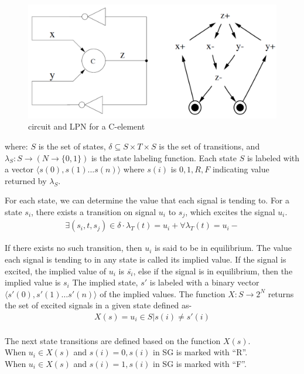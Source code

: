 \documentclass[10pt,journal,compsoc]{IEEEtran}
\begin{document}
\begin{figure}[hbt]
  \begin{center}
  \includegraphics[scale = 0.28]{celem_lpn}
  \end{center}
  \vspace{-2ex}
  \caption{circuit and LPN for a C-element}
  \label{celem_lpn}
  \vspace{-1ex}
\end{figure}

where: $S$ is the set of states, $\delta \subseteq S \times T \times S$ is the set of transitions, and $\lambda_S: S \rightarrow (N \rightarrow \{0,1\})$ is the
state labeling function. Each state $S$ is labeled with a vector $\langle s(0),s(1)...s(n)\rangle$ where $s(i)$ is $0,1,R,F$ indicating value returned by $\lambda_S$. 

For each state, we can determine the value that each signal is tending to. For a state $s_i$, there exists a transition on signal $u_i$ to $s_j$, which excites the signal $u_i$.
\begin{align*}
\exists(s_i,t,s_j)\in \delta\cdot\lambda_T(t) = u_i + \forall \lambda_T(t)= u_i-
\end{align*}

If there exists no such transition, then $u_i$ is said to be in equilibrium.
The value each signal is tending to in any state is called its implied value.
If the signal is excited, the implied value of $u_i$ is $\bar{s_i}$, else if the signal is in equilibrium, then the implied value is $s_i$
The implied state, $s'$ is labeled with a binary vector $\langle s'(0),s'(1)\dots s'(n)\rangle$ of the implied values.
The function $X : S \rightarrow 2^N$ returns the set of excited signals in a given state defined as-
\begin{align*}
 X(s) = {u_i \in S | s(i) \neq s'(i)}
\end{align*}\\
The next state transitions are defined based on the function $X(s)$.\\
When $u_i \in X(s)$ and $s(i) = 0, s(i)$ in SG is marked with “R”.\\
When $u_i \in X(s)$ and $s(i) = 1, s(i)$ in SG is marked with “F”.
\end{document}

